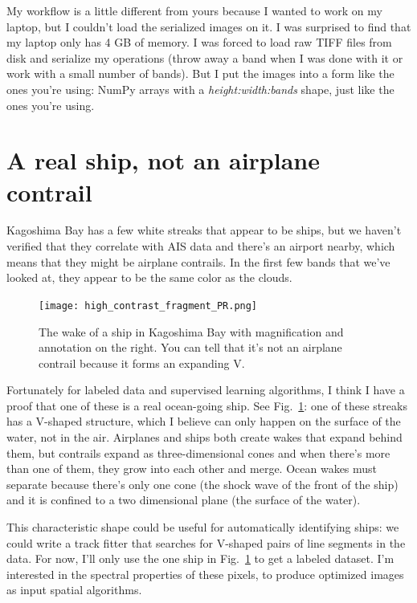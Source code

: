 \documentclass[12pt]{article}
\begin{document}
My workflow is a little different from yours because I wanted to work
on my laptop, but I couldn't load the serialized images on it.  I was
surprised to find that my laptop only has 4 GB of memory.  I was
forced to load raw TIFF files from disk and serialize my operations
(throw away a band when I was done with it or work with a small
number of bands).  But I put the images into a form like the ones
you're using: NumPy arrays with a {\it height:width:bands} shape, just
like the ones you're using.

\section{A real ship, not an airplane contrail}

Kagoshima Bay has a few white streaks that appear to be ships, but we
haven't verified that they correlate with AIS data and there's an
airport nearby, which means that they might be airplane contrails.  In
the first few bands that we've looked at, they appear to be the same
color as the clouds.

\begin{figure}
\begin{center}
\texttt{[image: high\_contrast\_fragment\_PR.png]}
\end{center}
\caption{The wake of a ship in Kagoshima Bay with magnification and
  annotation on the right.  You can tell that it's not an airplane
  contrail because it forms an expanding
  V.  \label{high_contrast_fragment}}
\end{figure}

Fortunately for labeled data and supervised learning algorithms, I
think I have a proof that one of these is a real ocean-going ship.
See Fig.~\ref{high_contrast_fragment}: one of these streaks has a
V-shaped structure, which I believe can only happen on the surface of
the water, not in the air.  Airplanes and ships both create wakes that
expand behind them, but contrails expand as three-dimensional cones
and when there's more than one of them, they grow into each other and
merge.  Ocean wakes must separate because there's only one cone (the
shock wave of the front of the ship) and it is confined to a two
dimensional plane (the surface of the water).

This characteristic shape could be useful for automatically
identifying ships: we could write a track fitter that searches for
V-shaped pairs of line segments in the data.  For now, I'll only use
the one ship in Fig.~\ref{high_contrast_fragment} to get a labeled
dataset.  I'm interested in the spectral properties of these pixels,
to produce optimized images as input spatial algorithms.
\end{document}
